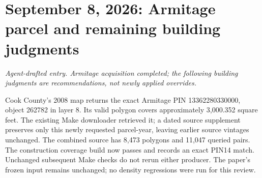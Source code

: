 \section*{September 8, 2026: Armitage parcel and remaining building judgments}
\textit{Agent-drafted entry. Armitage acquisition completed; the following building judgments are recommendations, not newly applied overrides.}

Cook County's 2008 map returns the exact Armitage PIN 13362280330000,
object 262782 in layer 8. Its valid polygon covers approximately 3,000.352
square feet. The existing Make downloader retrieved it; a dated source supplement
preserves only this newly requested parcel-year, leaving earlier source vintages
unchanged. The combined source has 8,473 polygons and 11,047 queried pairs.
The construction coverage build now passes and records an exact PIN14 match.
Unchanged subsequent Make checks do not rerun either producer. The paper's frozen
input remains unchanged; no density regressions were run for this review.

